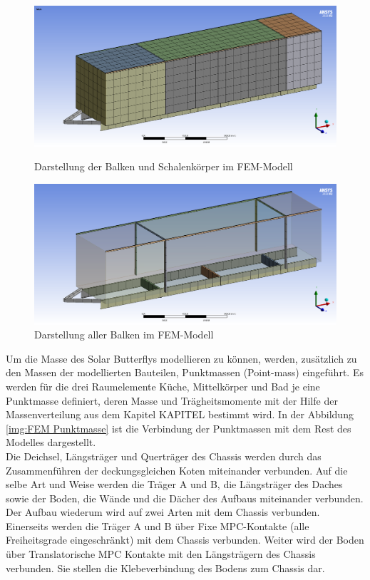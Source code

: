 \begin{figure}[h]
  \centering
  \begin{minipage}{.5\textwidth}
    \centering
    \includegraphics[width=.98\linewidth]{04_figures/FEM Mesh1.png}
    \caption{Darstellung der Balken und Schalenkörper im FEM-Modell}
    \label{FEM Mesh1}
  \end{minipage}%
  \begin{minipage}{.5\textwidth}
    \centering
    \includegraphics[width=.98\linewidth]{04_figures/FEM Mesh3.png}
    \caption{Darstellung aller Balken im FEM-Modell}
    \label{FEM Mesh3}
  \end{minipage}
\end{figure}

Um die Masse des Solar Butterflys modellieren zu können, werden, zusätzlich zu den Massen der modellierten Bauteilen, Punktmassen (Point-mass) eingeführt. Es werden für die drei Raumelemente Küche, Mittelkörper und Bad je eine Punktmasse definiert, deren Masse und Trägheitsmomente mit der Hilfe der Massenverteilung aus dem Kapitel KAPITEL bestimmt wird. In der Abbildung \ref{img:FEM Punktmasse} ist die Verbindung der Punktmassen mit dem Rest des Modelles dargestellt.\\
Die Deichsel, Längsträger und Querträger des Chassis werden durch das Zusammenführen der deckungsgleichen Koten miteinander verbunden. Auf die selbe Art und Weise werden die Träger A und B, die Längsträger des Daches sowie der Boden, die Wände und die Dächer des Aufbaus miteinander verbunden. Der Aufbau wiederum wird auf zwei Arten mit dem Chassis verbunden. Einerseits werden die Träger A und B über Fixe MPC-Kontakte (alle Freiheitsgrade eingeschränkt) mit dem Chassis verbunden. Weiter wird der Boden über Translatorische MPC Kontakte mit den Längsträgern des Chassis verbunden. Sie stellen die Klebeverbindung des Bodens zum Chassis dar.


